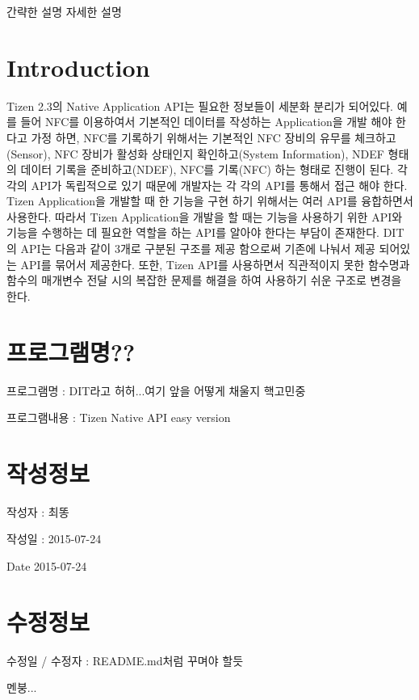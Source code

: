 간략한 설명 자세한 설명 \hypertarget{index_intro}{}\section{Introduction}\label{index_intro}
Tizen 2.\-3의 Native Application A\-P\-I는 필요한 정보들이 세분화 분리가 되어있다. 예를 들어 N\-F\-C를 이용하여서 기본적인 데이터를 작성하는 Application을 개발 해야 한다고 가정 하면, N\-F\-C를 기록하기 위해서는 기본적인 N\-F\-C 장비의 유무를 체크하고(\-Sensor), N\-F\-C 장비가 활성화 상태인지 확인하고(\-System Information), N\-D\-E\-F 형태의 데이터 기록을 준비하고(\-N\-D\-E\-F), N\-F\-C를 기록(\-N\-F\-C) 하는 형태로 진행이 된다. 각각의 A\-P\-I가 독립적으로 있기 때문에 개발자는 각 각의 A\-P\-I를 통해서 접근 해야 한다. Tizen Application을 개발할 때 한 기능을 구현 하기 위해서는 여러 A\-P\-I를 융합하면서 사용한다. 따라서 Tizen Application을 개발을 할 때는 기능을 사용하기 위한 A\-P\-I와 기능을 수행하는 데 필요한 역할을 하는 A\-P\-I를 알아야 한다는 부담이 존재한다. D\-I\-T의 A\-P\-I는 다음과 같이 3개로 구분된 구조를 제공 함으로써 기존에 나눠서 제공 되어있는 A\-P\-I를 묶어서 제공한다. 또한, Tizen A\-P\-I를 사용하면서 직관적이지 못한 함수명과 함수의 매개변수 전달 시의 복잡한 문제를 해결을 하여 사용하기 쉬운 구조로 변경을 한다. \hypertarget{index_Program}{}\section{프로그램명??}\label{index_Program}

\begin{DoxyItemize}
\item 프로그램명 \-: D\-I\-T라고 허허...여기 앞을 어떻게 채울지 핵고민중
\item 프로그램내용 \-: Tizen Native A\-P\-I easy version 
\end{DoxyItemize}\hypertarget{index_CREATEINFO}{}\section{작성정보}\label{index_CREATEINFO}

\begin{DoxyItemize}
\item 작성자 \-: 최똥
\item 작성일 \-: 2015-\/07-\/24 \begin{DoxyDate}{Date}
2015-\/07-\/24 
\end{DoxyDate}

\end{DoxyItemize}\hypertarget{index_MODIFYINFO}{}\section{수정정보}\label{index_MODIFYINFO}

\begin{DoxyItemize}
\item 수정일 / 수정자 \-: R\-E\-A\-D\-M\-E.\-md처럼 꾸며야 할듯
\item 멘붕... 

 
\end{DoxyItemize}